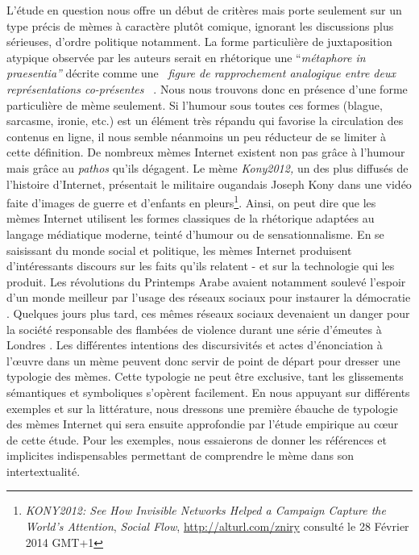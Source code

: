 L{\textquoteright}étude en question nous offre un début de critères mais porte seulement sur un type précis de mèmes à caractère plutôt comique, ignorant les discussions plus sérieuses, d{\textquoteright}ordre politique notamment. La forme particulière de juxtaposition atypique observée par les auteurs serait en rhétorique une {\textquotedblleft}\textit{métaphore in praesentia{\textquotedblright} }décrite comme une \textit{{\guillemotleft}~figure de rapprochement analogique entre deux représentations co-présentes~{\guillemotright}} \citep{Jenny2012}. Nous nous trouvons donc en présence d{\textquoteright}une forme particulière de mème seulement. Si l{\textquoteright}humour sous toutes ces formes (blague, sarcasme, ironie, etc.) est un élément très répandu qui favorise la circulation des contenus en ligne, il nous semble néanmoins un peu réducteur de se limiter à cette définition. De nombreux mèmes Internet existent non pas gr\^ace à l{\textquoteright}humour mais gr\^ace au \textit{pathos} qu{\textquoteright}ils dégagent. Le mème \textit{Kony2012, }un des plus diffusés de l{\textquoteright}histoire d{\textquoteright}Internet, présentait le militaire ougandais Joseph Kony dans une vidéo faite d{\textquoteright}images de guerre et d{\textquoteright}enfants en pleurs\footnote{ \textit{KONY2012: See How Invisible Networks Helped a Campaign Capture the World's Attention}, \textit{Social Flow}, \url{http://alturl.com/zniry} consulté le 28 Février 2014 GMT+1}. Ainsi, on peut dire que les mèmes Internet utilisent les formes classiques de la rhétorique adaptées au langage médiatique moderne,  teinté d{\textquoteright}humour ou de sensationnalisme. En se saisissant du monde social et politique, les mèmes Internet produisent d{\textquoteright}intéressants discours sur les faits qu{\textquoteright}ils relatent - et sur la technologie qui les produit. Les révolutions du Printemps Arabe avaient notamment soulevé l{\textquoteright}espoir d{\textquoteright}un monde meilleur par l{\textquoteright}usage des réseaux sociaux pour instaurer la démocratie \citep{Lotan2011}. Quelques jours plus tard, ces mêmes réseaux sociaux devenaient un danger pour la société responsable des flambées de violence durant une série d{\textquoteright}émeutes à Londres \citep{Casilli2011}. Les différentes intentions des discursivités et actes d{\textquoteright}énonciation à l{\textquoteright}{\oe}uvre dans un mème peuvent donc servir de point de départ pour dresser une typologie des mèmes. Cette typologie ne peut être exclusive, tant les glissements sémantiques et symboliques s'opèrent facilement. En nous appuyant sur différents exemples et sur la littérature, nous dressons une première ébauche de typologie des mèmes Internet qui sera ensuite approfondie par l{\textquoteright}étude empirique au c{\oe}ur de cette étude. Pour les exemples, nous essaierons de donner les références et implicites indispensables permettant de comprendre le mème dans son intertextualité.


